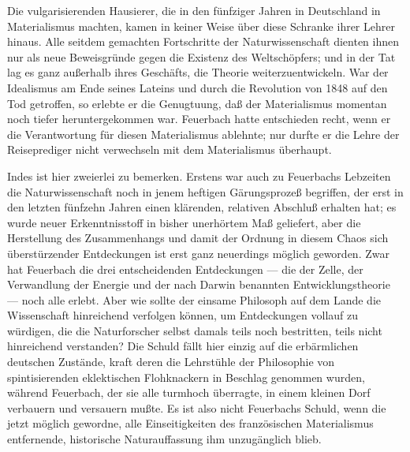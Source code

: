 Die vulgarisierenden Hausierer, die in den fünfziger Jahren in
Deutschland in Materialismus machten, kamen in keiner Weise über diese
Schranke ihrer Lehrer hinaus. Alle seitdem gemachten Fortschritte der
Naturwissenschaft dienten ihnen nur als neue Beweisgründe gegen die
Existenz des Weltschöpfers; und in der Tat lag es ganz außerhalb ihres
Geschäfts, die Theorie weiterzuentwickeln. War der Idealismus am Ende
seines Lateins und durch die Revolution von 1848 auf den Tod getroffen,
so erlebte er die Genugtuung, daß der Materialismus momentan noch tiefer
heruntergekommen war. Feuerbach hatte entschieden recht, wenn er die
Verantwortung für diesen Materialismus ablehnte; nur durfte er die Lehre
der Reiseprediger nicht verwechseln mit dem Materialismus überhaupt.

Indes ist hier zweierlei zu bemerken. Erstens war auch zu
Feuerbachs Lebzeiten die Naturwissenschaft noch in jenem heftigen
Gärungsprozeß begriffen, der erst in den letzten fünfzehn Jahren einen
klärenden, relativen Abschluß erhalten hat; es wurde neuer
Erkenntnisstoff in bisher unerhörtem Maß geliefert, aber die Herstellung
des Zusammenhangs und damit der Ordnung in diesem Chaos sich
überstürzender Entdeckungen ist erst ganz neuerdings möglich geworden.
Zwar hat Feuerbach die drei entscheidenden Entdeckungen --- die der Zelle,
der Verwandlung der Energie und der nach Darwin benannten
Entwicklungstheorie --- noch alle erlebt. Aber wie sollte der einsame
Philosoph auf dem Lande die Wissenschaft hinreichend verfolgen können,
um Entdeckungen vollauf zu würdigen, die die Naturforscher selbst damals
teils noch bestritten, teils nicht hinreichend verstanden? Die Schuld
fällt hier einzig auf die erbärmlichen deutschen Zustände, kraft deren
die Lehrstühle der Philosophie von spintisierenden eklektischen
Flohknackern in Beschlag genommen wurden, während Feuerbach, der sie
alle turmhoch überragte, in einem kleinen Dorf verbauern und versauern
mußte. Es ist also nicht Feuerbachs Schuld, wenn die jetzt möglich
gewordne, alle Einseitigkeiten des französischen Materialismus
entfernende, historische Naturauffassung ihm unzugänglich blieb.

